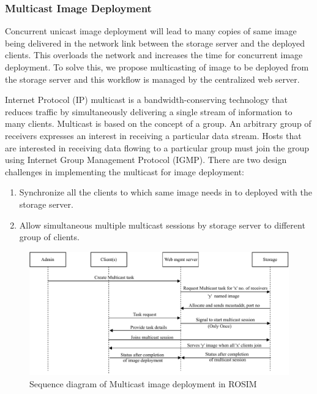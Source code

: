 \documentclass[a4paper,12pt]{article}
\begin{document}
\subsubsection{ Multicast Image Deployment}
Concurrent unicast image deployment will lead to many copies of same image being delivered in the network link between the storage server and the deployed clients. This overloads the network and increases the time for concurrent image deployment. To solve this, we propose multicasting of image to be deployed from the storage server and this workflow is managed by the centralized web server.

Internet Protocol (IP) multicast is a bandwidth-conserving technology that reduces traffic by simultaneously delivering a single stream of information to many clients. Multicast is based on the concept of a group. An arbitrary group of receivers expresses an interest in receiving a particular data stream. Hosts that are interested in receiving data flowing to a particular group must join the group using Internet Group Management Protocol (IGMP). There are two design challenges in implementing the multicast for image deployment:
 \begin{enumerate}[label=\roman*.]

     \item Synchronize all the clients to which same image needs in to deployed with the storage server.
     \item Allow simultaneous multiple multicast sessions by storage server to different group of clients.
 \end{enumerate}

\begin{figure}[h!]
    \centering
    \includegraphics[width=\linewidth]{Multicasting.pdf}
    \caption{Sequence diagram of Multicast image deployment in ROSIM}
    \label{Multicast_seq}
\end{figure}
\end{document}
